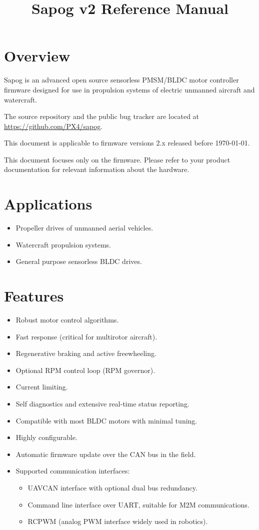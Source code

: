 \documentclass{zubaxdoc}
\title{Sapog v2 Reference Manual}
\begin{document}
\frontmatter

\begin{titlepage}
\section*{Overview}\label{sec:overview}

Sapog is an advanced open source sensorless PMSM/\allowbreak{}BLDC motor controller firmware designed for
use in propulsion systems of electric unmanned aircraft and watercraft.

The source repository and the public bug tracker are located at
\url{https://github.com/PX4/sapog}.

This document is applicable to firmware versions 2.x released before \today.

This document focuses only on the firmware.
Please refer to your product documentation for relevant information about the hardware.

\section*{Applications}
\begin{itemize}
    \item Propeller drives of unmanned aerial vehicles.
    \item Watercraft propulsion systems.
    \item General purpose sensorless BLDC drives.
\end{itemize}

\BeginRightColumn
\section*{Features}
\begin{itemize}
    \item Robust motor control algorithms.
    \item Fast response (critical for multirotor aircraft).
    \item Regenerative braking and active freewheeling.
    \item Optional RPM control loop (RPM governor).
    \item Current limiting.
    \item Self diagnostics and extensive real-time status reporting.
    \item Compatible with most BLDC motors with minimal tuning.
    \item Highly configurable.
    \item Automatic firmware update over the CAN bus in the field.
    \item Supported communication interfaces:
    \begin{itemize}
        \item UAVCAN interface with optional dual bus redundancy.
        \item Command line interface over UART, suitable for M2M communications.
        \item RCPWM (analog PWM interface widely used in robotics).
    \end{itemize}
\end{itemize}


\end{titlepage}
\end{document}
